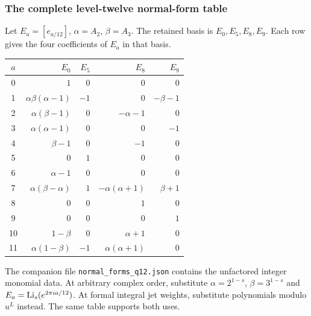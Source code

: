 \subsubsection{The complete level-twelve normal-form table}
\label{ir:tab:complete12}
Let $E_a=[e_{a/12}]$, $\alpha=A_2$, $\beta=A_3$.
The retained basis is $E_0,E_5,E_8,E_9$. Each row gives the four
coefficients of $E_a$ in that basis.
\begin{center}
\renewcommand{\arraystretch}{1.28}
\begin{tabular}{@{}c r r r r@{}}
\toprule
$a$&$E_0$&$E_5$&$E_8$&$E_9$\\
\midrule
0&$1$&$0$&$0$&$0$\\
1&$\alpha\beta(\alpha-1)$&$-1$&$0$&$-\beta-1$\\
2&$\alpha(\beta-1)$&$0$&$-\alpha-1$&$0$\\
3&$\alpha(\alpha-1)$&$0$&$0$&$-1$\\
4&$\beta-1$&$0$&$-1$&$0$\\
5&$0$&$1$&$0$&$0$\\
6&$\alpha-1$&$0$&$0$&$0$\\
7&$\alpha(\beta-\alpha)$&$1$&$-\alpha(\alpha+1)$&$\beta+1$\\
8&$0$&$0$&$1$&$0$\\
9&$0$&$0$&$0$&$1$\\
10&$1-\beta$&$0$&$\alpha+1$&$0$\\
11&$\alpha(1-\beta)$&$-1$&$\alpha(\alpha+1)$&$0$\\
\bottomrule
\end{tabular}
\end{center}
The companion file \texttt{normal\_forms\_q12.json} contains the
unfactored integer monomial data. At arbitrary complex order, substitute
$\alpha=2^{1-s}$, $\beta=3^{1-s}$ and
$E_a=\operatorname{Li}_s(e^{2\pi ia/12})$. At formal integral jet weights, substitute
polynomials modulo $u^L$ instead. The same table supports both uses.
